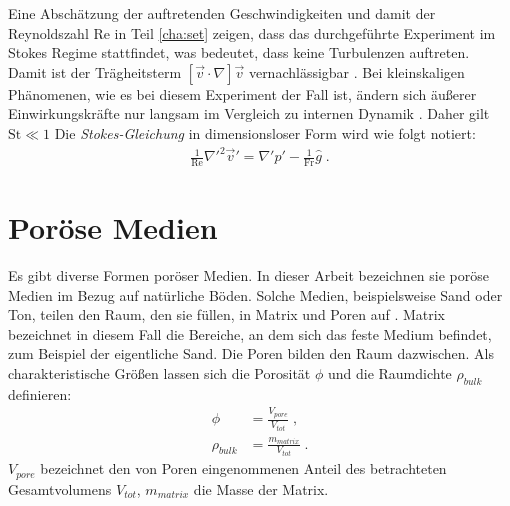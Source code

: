 Eine Abschätzung der auftretenden Geschwindigkeiten und damit der Reynoldszahl Re in Teil \ref{cha:set} zeigen, dass das durchgeführte Experiment im Stokes Regime stattfindet, was bedeutet, dass keine Turbulenzen auftreten. Damit ist der Trägheitsterm $\left[ \vec{v} \cdot \nabla \right] \vec{v}$ vernachlässigbar \citep{roth2005}. 
Bei kleinskaligen Phänomenen, wie es bei diesem Experiment der Fall ist, ändern sich äußerer Einwirkungskräfte nur langsam im Vergleich zu internen Dynamik \citep{roth2005}. Daher gilt $\mathrm{St} \ll 1$
Die \textit{Stokes-Gleichung}  in dimensionsloser Form wird wie folgt notiert:
\begin{align}
 \frac{1}{\mathrm{Re}}\nabla'^2\vec{v}' = \nabla'p' - \frac{1}{\mathrm{Fr}}\hat{g} \; .
\end{align}







\section{Poröse Medien}
\label{sec:por}

Es gibt diverse Formen poröser Medien. In dieser Arbeit bezeichnen sie poröse Medien im Bezug auf natürliche Böden. Solche Medien, beispielsweise Sand oder Ton, teilen den Raum, den sie füllen, in Matrix und Poren auf \citep{roth2005}. Matrix bezeichnet in diesem Fall die Bereiche, an dem sich das feste Medium befindet, zum Beispiel der eigentliche Sand. Die Poren bilden den Raum dazwischen.
Als charakteristische Größen lassen sich die Porosität $\phi$ und die Raumdichte $\rho_{bulk}$ definieren:
\begin{align}
 \phi &= \frac{V_{pore}}{V_{tot}}  \; ,\\
 \rho_{bulk} &= \frac{m_{matrix}}{V_{tot}} \; . %
\end{align}
$V_{pore}$ bezeichnet den von Poren eingenommenen Anteil des betrachteten Gesamtvolumens $V_{tot}$, $m_{matrix}$ die Masse der Matrix. 

